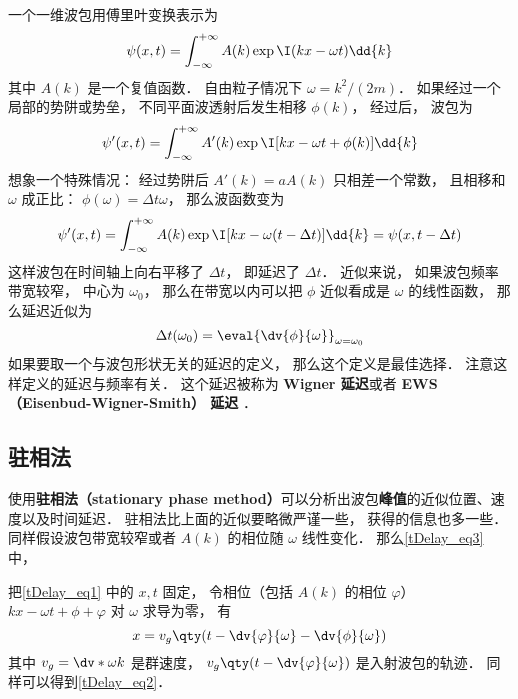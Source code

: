 
\begin{issues}
\issueDraft
\end{issues}

一个一维波包用傅里叶变换表示为
\begin{equation}\label{tDelay_eq3}
\psi(x, t) = \int_{-\infty}^{+\infty} A(k) \exp \I( kx - \omega t) \dd{k}
\end{equation}
其中 $A(k)$ 是一个复值函数． 自由粒子情况下 $\omega = k^2/(2m)$． 如果经过一个局部的势阱或势垒， 不同平面波透射后发生相移 $\phi(k)$， 经过后， 波包为
\begin{equation}\label{tDelay_eq1}
\psi'(x, t) = \int_{-\infty}^{+\infty} A'(k) \exp \I[kx - \omega t + \phi(k)] \dd{k}
\end{equation}
想象一个特殊情况： 经过势阱后 $A'(k) = a A(k)$ 只相差一个常数， 且相移和 $\omega$ 成正比： $\phi(\omega) = \Delta t \omega$， 那么波函数变为
\begin{equation}
\psi'(x, t) = \int_{-\infty}^{+\infty} A(k) \exp \I[kx - \omega (t - \Delta t) ] \dd{k}
= \psi(x, t - \Delta t)
\end{equation}
这样波包在时间轴上向右平移了 $\Delta t$， 即延迟了 $\Delta t$． 近似来说， 如果波包频率带宽较窄， 中心为 $\omega_0$， 那么在带宽以内可以把 $\phi$ 近似看成是 $\omega$ 的线性函数， 那么延迟近似为
\begin{equation}\label{tDelay_eq2}
\Delta t(\omega_0) = \eval{\dv{\phi}{\omega}}_{\omega = \omega_0}
\end{equation}
如果要取一个与波包形状无关的延迟的定义， 那么这个定义是最佳选择． 注意这样定义的延迟与频率有关． 这个延迟被称为 \textbf{Wigner 延迟}或者 \textbf{EWS （Eisenbud-Wigner-Smith） 延迟} ．

\subsection{驻相法}
使用\textbf{驻相法（stationary phase method）}可以分析出波包\textbf{峰值}的近似位置、速度以及时间延迟． 驻相法比上面的近似要略微严谨一些， 获得的信息也多一些． 同样假设波包带宽较窄或者 $A(k)$ 的相位随 $\omega$ 线性变化． 那么\autoref{tDelay_eq3} 中， 

把\autoref{tDelay_eq1} 中的 $x, t$ 固定， 令相位（包括 $A(k)$ 的相位 $\varphi$） $kx - \omega t + \phi + \varphi$ 对 $\omega$ 求导为零， 有
\begin{equation}
x = v_g \qty(t - \dv{\varphi}{\omega} - \dv{\phi}{\omega})
\end{equation}
其中 $v_g = \dv*{\omega}{k}$ 是群速度， $v_g \qty(t - \dv{\varphi}{\omega})$ 是入射波包的轨迹． 同样可以得到\autoref{tDelay_eq2}．

